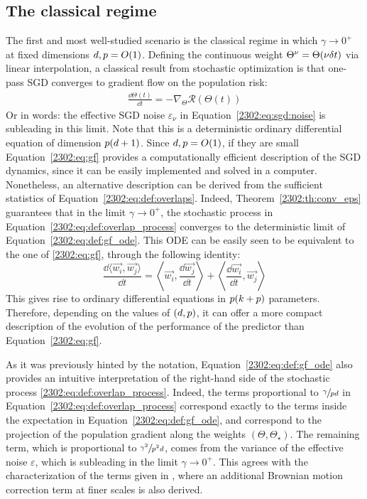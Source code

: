\subsection{The classical regime}
\label{2302:sec:classic}
The first and most well-studied scenario is the classical regime in which $\gamma\to 0^{+}$ at fixed dimensions $d, p = O(1)$.  Defining the continuous weight $\Theta^{\nu} = \Theta(\nu\delta t)$ via linear interpolation, a classical result from stochastic optimization  \citep{robbins1951stochastic} is that one-pass SGD converges to gradient flow on the population risk:
\begin{align}
\label{2302:eq:gf}
\frac{\dd \Theta(t)}{\dd t} = -\nabla_{\Theta}\mathcal{R}(\Theta(t)) 
\end{align}
Or in words: the effective SGD noise $\varepsilon_{\nu}$ in Equation~\eqref{2302:eq:sgd:noise} is subleading in this limit. Note that this is a deterministic ordinary differential equation of dimension $p(d+1)$. Since $d,p = O(1)$, if they are small Equation~\eqref{2302:eq:gf} provides a computationally efficient description of the SGD dynamics, since it can be easily implemented and solved in a computer. Nonetheless, an alternative description can be derived from the sufficient statistics of Equation~\eqref{2302:eq:def:overlaps}. Indeed, Theorem~\ref{2302:th:conv_eps} guarantees that in the limit $\gamma\to 0^{+}$, the stochastic process in Equation~\eqref{2302:eq:def:overlap_process} converges to the deterministic limit of Equation~\eqref{2302:eq:def:gf_ode}. This ODE can be easily seen to be equivalent to the one of \eqref{2302:eq:gf}, through the following identity:
\[ \frac{\dd  \langle \vec{w_i}, \vec{w_j} \rangle}{\dd{t}} = \left\langle \vec{w_i}, \frac{\dd\vec{w_j}}{\dd{t}} \right\rangle + \left\langle \frac{\dd\vec{w_i}}{\dd{t}}, \vec{w_j} \right\rangle \]
This gives rise to ordinary differential equations in $p (k+p)$ parameters. Therefore, depending on the values of $(d,p)$, it can offer a more compact description of the evolution of the performance of the predictor than Equation~\eqref{2302:eq:gf}. 

As it was previously hinted by the notation, Equation~\eqref{2302:eq:def:gf_ode} also provides an intuitive interpretation of the right-hand side of the stochastic process \eqref{2302:eq:def:overlap_process}. Indeed, the terms proportional to $\sfrac{\gamma}{p d}$ in Equation~\eqref{2302:eq:def:overlap_process} correspond exactly to the terms inside the expectation in Equation~\eqref{2302:eq:def:gf_ode}, and correspond to the projection of the population gradient along the weights $(\Theta, \Theta_{\star})$. The remaining term, which is proportional to $\sfrac{\gamma^2}{p^2 d}$, comes from the variance of the effective noise $\varepsilon$, which is subleading in the limit $\gamma\to 0^{+}$. This agrees with the characterization of the terms given in \cite{arous2022high}, where an additional Brownian motion correction term at finer scales is also derived.

